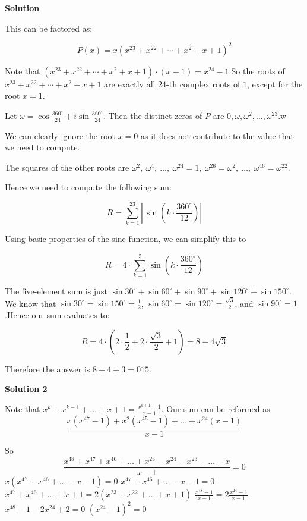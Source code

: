 \begin{enumerate}
\textbf{Solution}

This can be factored as:

 
 \[P(x) = x\left( x^{23} + x^{22} + \cdots + x^2 + x + 1 \right)^2\]

 Note that $\left( x^{23} + x^{22} + \cdots + x^2 + x + 1 \right) \cdot (x-1) = x^{24} - 1$.So the roots of $x^{23} + x^{22} + \cdots + x^2 + x + 1$ are exactly all $24$-th complex roots of $1$, except for the root $x=1$. 

 Let $\omega=\cos \frac{360^\circ}{24} + i\sin \frac{360^\circ}{24}$. Then the distinct zeros of $P$ are $0,\omega,\omega^2,\dots,\omega^{23}$.w

 We can clearly ignore the root $x=0$ as it does not contribute to the value that we need to compute. 

 The squares of the other roots are $\omega^2,~\omega^4,~\dots,~\omega^{24}=1,~\omega^{26}=\omega^2,~\dots,~\omega^{46}=\omega^{22}$.

 Hence we need to compute the following sum:

 
 \[R = \sum_{k = 1}^{23} \left|\, \sin \left( k\cdot \frac{360^\circ}{12} \right) \right|\]

 Using basic properties of the sine function, we can simplify this to

 
 \[R = 4 \cdot \sum_{k = 1}^{5} \sin \left( k\cdot \frac{360^\circ}{12} \right)\]

 The five-element sum is just $\sin 30^\circ + \sin 60^\circ + \sin 90^\circ + \sin 120^\circ + \sin 150^\circ$. We know that $\sin 30^\circ = \sin 150^\circ = \frac 12$, $\sin 60^\circ = \sin 120^\circ = \frac{\sqrt 3}2$, and $\sin 90^\circ = 1$.Hence our sum evaluates to:

 
 \[R = 4 \cdot \left( 2\cdot \frac 12 + 2\cdot \frac{\sqrt 3}2 + 1 \right) = 8 + 4\sqrt 3\]

 Therefore the answer is $8+4+3 = \boxed{015}$.

 



\textbf{Solution 2}

Note that $x^k + x^{k-1} + \dots + x + 1 = \frac{x^{k+1} - 1}{x - 1}$. Our sum can be reformed as 
 \[\frac{x(x^{47} - 1) + x^2(x^{45} - 1) + \dots + x^{24}(x - 1)}{x-1}\]

 So 
 \[\frac{x^{48} + x^{47} + x^{46} + \dots + x^{25} - x^{24} - x^{23} - \dots - x}{x-1} = 0\]
$x(x^{47} + x^{46} + \dots - x - 1) = 0$
$x^{47} + x^{46} + \dots - x - 1 = 0$
$x^{47} + x^{46} + \dots + x + 1 = 2(x^{23} + x^{22} + \dots + x + 1)$
$\frac{x^{48} - 1}{x - 1} = 2\frac{x^{24} - 1}{x - 1}$
$x^{48} - 1 - 2x^{24} + 2 = 0$
$(x^{24} - 1)^2 = 0$


\end{enumerate}
